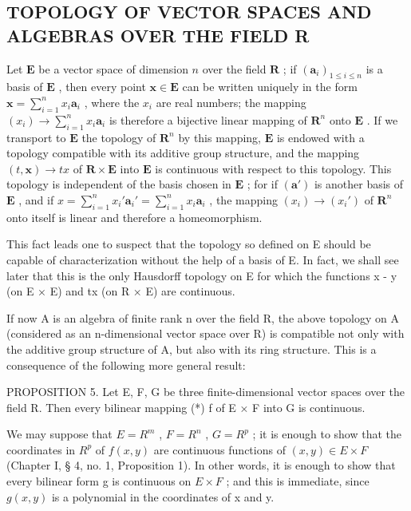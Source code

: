 \subsection{TOPOLOGY OF VECTOR SPACES AND ALGEBRAS OVER THE FIELD R}

Let \(\mathbf{E}\) be a vector space of dimension \(n\) over the field \(\mathbf{R}\) ; if \((\boldsymbol{a}_i)_{1 \leqslant i \leqslant n}\) is a basis of \(\mathbf{E}\) , then every point \(\boldsymbol{x} \in \mathbf{E}\) can be written uniquely in the form \(\boldsymbol{x} = \sum_{i=1}^{n} x_i \boldsymbol{a}_i\) , where the \(x_i\) are real numbers; the mapping \((x_i) \to \sum_{i=1}^{n} x_i \boldsymbol{a}_i\) is therefore a bijective linear mapping of \(\mathbf{R}^n\) onto \(\mathbf{E}\) . If we transport to \(\mathbf{E}\) the topology of \(\mathbf{R}^n\) by this mapping, \(\mathbf{E}\) is endowed with a topology compatible with its additive group structure, and the mapping \((t, \boldsymbol{x}) \to tx\) of \(\mathbf{R} \times \mathbf{E}\) into \(\mathbf{E}\) is continuous with respect to this topology. This topology is independent of the basis chosen in \(\mathbf{E}\) ; for if \((\boldsymbol{a}')\) is another basis of \(\mathbf{E}\) , and if \(x = \sum_{i=1}^{n} x_i' \boldsymbol{a}_i' = \sum_{i=1}^{n} x_i \boldsymbol{a}_i\) , the mapping \((x_i) \to (x_i')\) of \(\mathbf{R}^n\) onto itself is linear and therefore a homeomorphism.

This fact leads one to suspect that the topology so defined on E should be capable of characterization without the help of a basis of E. In fact, we shall see later that this is the only Hausdorff topology on E for which the functions x - y (on E × E) and tx (on R × E) are continuous.

If now A is an algebra of finite rank n over the field R, the above topology on A (considered as an n-dimensional vector space over R) is compatible not only with the additive group structure of A, but also with its ring structure. This is a consequence of the following more general result:

PROPOSITION 5. Let E, F, G be three finite-dimensional vector spaces over the field R. Then every bilinear mapping (*) f of E × F into G is continuous.

We may suppose that \(E = R^{m}\) , \(F = R^{n}\) , \(G = R^{p}\) ; it is enough to show that the coordinates in \(R^{p}\) of \(f(x, y)\) are continuous functions of \((x, y) \in E \times F\) (Chapter I, § 4, no. 1, Proposition 1). In other words, it is enough to show that every bilinear form g is continuous on \(E \times F\) ; and this is immediate, since \(g(x, y)\) is a polynomial in the coordinates of x and y.

